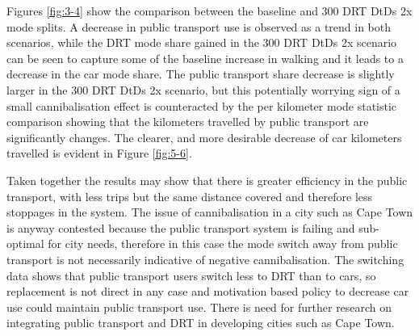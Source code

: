 \documentclass[a4paper]{article}
\begin{document}

Figures \ref{fig:3-4} show the comparison between the baseline and 300 DRT DtDs 2x mode splits. A decrease in public transport use is observed as a trend in both scenarios, while the DRT mode share gained in the 300 DRT DtDs 2x scenario can be seen to capture some of the baseline increase in walking and it leads to a decrease in the car mode share.
The public transport share decrease is slightly larger in the 300 DRT DtDs 2x scenario, but this potentially worrying sign of a small cannibalisation effect is counteracted by the per kilometer mode statistic comparison showing that the kilometers travelled by public transport are significantly changes. The clearer, and more desirable decrease of car kilometers travelled is evident in Figure \ref{fig:5-6}.

Taken together the results may show that there is greater efficiency in the public transport, with less trips but the same distance covered and therefore less stoppages in the system. The issue of cannibalisation in a city such as Cape Town is anyway contested because the public transport system is failing and sub-optimal for city needs, therefore in this case the mode switch away from public transport is not necessarily indicative of negative cannibalisation. The switching data shows that public transport users switch less to DRT than to cars, so replacement is not direct in any case and motivation based policy to decrease car use could maintain public transport use. There is need for further research on integrating public transport and DRT in developing cities such as Cape Town.\\
\end{document}
